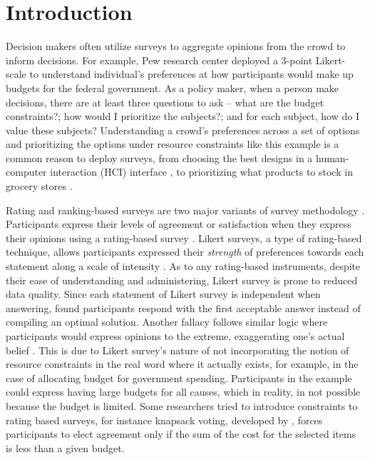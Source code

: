 \section{Introduction}
Decision makers often utilize surveys to aggregate opinions from the crowd to inform decisions. For example, Pew research center deployed a 3-point Likert-scale to understand individual's preferences at how participants would make up budgets for the federal government. As a policy maker, when a person make decisions, there are at least three questions to ask -- what are the budget constraints?; how would I prioritize the subjects?; and for each subject, how do I value these subjects? Understanding a crowd's preferences across a set of options and prioritizing the options under resource constraints like this example is a common reason to deploy surveys, from choosing the best designs in a human-computer interaction (HCI) interface \cite{ledo2018evaluation}, to prioritizing what products to stock in grocery stores \cite{nielsen}.

Rating and ranking-based surveys are two major variants of survey methodology \cite{moors2016two}. Participants express their levels of agreement or satisfaction when they express their opinions using a rating-based survey \cite{moors2016two}. Likert surveys, a type of rating-based technique, allows participants expressed their \textit{strength} of preferences towards each statement along a scale of intensity \cite{likert1932technique}. As to any rating-based instruments, despite their ease of understanding and administering, Likert survey is prone to reduced data quality. Since each statement of Likert survey is independent when answering, \textcite{alwin1985measurement} found participants respond with the first acceptable answer instead of compiling an optimal solution. Another fallacy follows similar logic where participants would express opinions to the extreme, exaggerating one's actual belief \cite{araujo2017much, vavreck2007exaggerated}. This is due to Likert survey's nature of not incorporating the notion of resource constraints in the real word where it actually exists, for example, in the case of allocating budget for government spending. Participants in the example could express having large budgets for all causes, which in reality, in not possible because the budget is limited. Some researchers tried to introduce constraints to rating based surveys, for instance knapsack voting, developed by \textcite{goel2015knapsack}, forces participants to elect agreement only if the sum of the cost for the selected items is less than a given budget.

